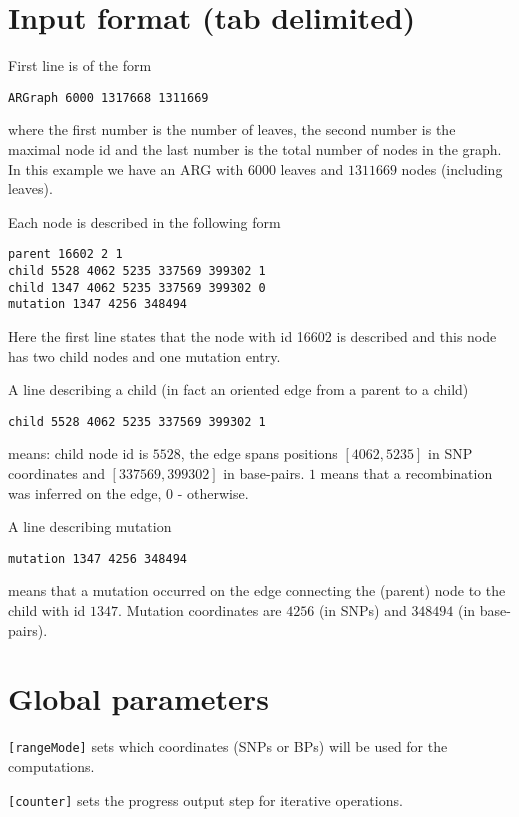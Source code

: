 \documentclass[11pt]{amsart}
\theoremstyle{definition}
\theoremstyle{remark}
\begin{document}
\section{Input format (tab delimited)}

	First line is of the form
	\begin{displayquote}
		\texttt{ARGraph 6000 1317668 1311669}
	\end{displayquote}
	where the first number is the number of leaves, the second number is the maximal node id and the last number is the total number of nodes in the graph. In this example we have an ARG with $6000$ leaves and $1311669$ nodes (including leaves).

	Each node is described in the following form
	\begin{displayquote}
		\texttt{parent 16602 2 1\\
			child 5528 4062 5235 337569 399302 1\\
			child 1347 4062 5235 337569 399302 0\\
			mutation 1347 4256 348494}
	\end{displayquote}
	Here the first line states that the node with id 16602 is described and this node has two child nodes and one mutation entry.

	A line describing a child (in fact an oriented edge from a parent to a child)
	\begin{displayquote}
		\texttt{child 5528 4062 5235 337569 399302 1}
	\end{displayquote}
	means: child node id is $5528$, the edge spans positions $[4062, 5235]$ in SNP coordinates and $[337569, 399302]$ in base-pairs. $1$ means that a recombination was inferred on the edge, $0$ - otherwise.

	A line describing mutation
	\begin{displayquote}
		\texttt{mutation 1347 4256 348494}
	\end{displayquote}
	means that a mutation occurred on the edge connecting the (parent) node to the child with id $1347$. Mutation coordinates are $4256$ (in SNPs) and $348494$ (in base-pairs).

\section{Global parameters}
	\texttt{[rangeMode]} sets which coordinates (SNPs or BPs) will be used for the computations.
	
	\texttt{[counter]} sets the progress output step for iterative operations.
\end{document}
